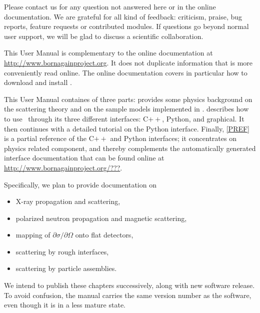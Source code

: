 %
Please contact us for any question not answered here
or in the online documentation.
We are grateful for all kind of feedback:
criticism, praise, bug reports, feature requests or contributed modules.
If questions go beyond normal user support,
we will be glad to discuss a scientific collaboration.


This User Manual is complementary to the online documentation
at \url{http://www.bornagainproject.org}.
It does not duplicate information that is more conveniently read online.
The online documentation covers in particular
how to download and install \BornAgain.

This User Manual containes of three parts:
 provides some physics background
on the scattering theory and on the sample models implemented in \BornAgain.
 describes how to use \BornAgain\ through its three different interfaces:
C$++$, Python, and graphical.
It then continues with a detailed tutorial on the Python interface.
Finally, \cref{PREF} is a partial reference of the C$++$ and Python interfaces;
it concentrates on physics related component,
and thereby complements the automatically generated interface documentation
that can be found online at \url{http://www.bornagainproject.org/???}. %

Specifically,
we plan to provide documentation on
\begin{itemize}
\item X-ray propagation and scattering,
%
%
\item polarized neutron propagation and magnetic scattering,
%
%
%
\item mapping of $\partial\sigma/\partial\Omega$ onto flat detectors,
%
\item scattering by rough interfaces,
%
\item scattering by particle assemblies.
%
\end{itemize}
We intend to publish these chapters successively,
along with new software release.
To avoid confusion, the manual carries
the same version number as the software,
even though it is in a less mature state.

